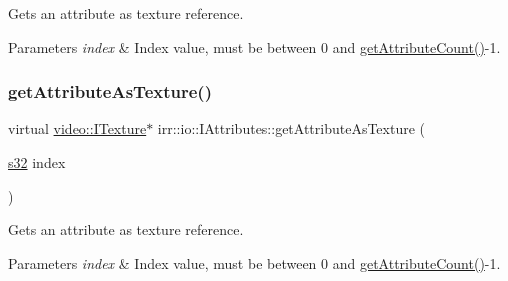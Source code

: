 Gets an attribute as texture reference. 


\begin{DoxyParams}{Parameters}
{\em index} & Index value, must be between 0 and \hyperlink{classirr_1_1io_1_1IAttributes_a796bdd9440ee7ba0b6742a90a82870b6}{get\+Attribute\+Count()}-\/1. \\
\hline
\end{DoxyParams}
\mbox{\label{classirr_1_1io_1_1IAttributes_ad022db880ccf7844c720efceef7c22fc}} 
\subsubsection{\texorpdfstring{get\+Attribute\+As\+Texture()}{getAttributeAsTexture()}\hspace{0.1cm}{\footnotesize\ttfamily [4/4]}}
{\footnotesize\ttfamily virtual \hyperlink{classirr_1_1video_1_1ITexture}{video\+::\+I\+Texture}$\ast$ irr\+::io\+::\+I\+Attributes\+::get\+Attribute\+As\+Texture (\begin{DoxyParamCaption}\item[{\hyperlink{namespaceirr_ac66849b7a6ed16e30ebede579f9b47c6}{s32}}]{index }\end{DoxyParamCaption})\hspace{0.3cm}{\ttfamily [pure virtual]}}



Gets an attribute as texture reference. 


\begin{DoxyParams}{Parameters}
{\em index} & Index value, must be between 0 and \hyperlink{classirr_1_1io_1_1IAttributes_a796bdd9440ee7ba0b6742a90a82870b6}{get\+Attribute\+Count()}-\/1. \\
\hline
\end{DoxyParams}
\mbox{\label{classirr_1_1io_1_1IAttributes_a11b477925de4a257400cc7c920ec5e40}} 
